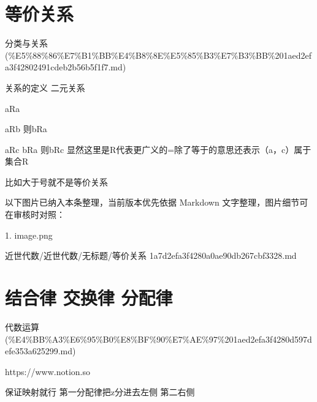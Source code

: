 \section*{等价关系}

\begin{note}[来源上级主题]

分类与关系 (\%E5\%88\%86\%E7\%B1\%BB\%E4\%B8\%8E\%E5\%85\%B3\%E7\%B3\%BB\%201aed2efa3f42802491cdeb2b56b5f1f7.md)

\end{note}

\begin{note}[等价关系]

关系的定义 二元关系

aRa

aRb 则bRa

aRc bRa 则bRc  显然这里是R代表更广义的=除了等于的意思还表示（a，c）属于集合R

比如大于号就不是等价关系

\end{note}

\begin{note}[关联图片]
以下图片已纳入本条整理，当前版本优先依据 Markdown 文字整理，图片细节可在审核时对照：

1. image.png\\

\end{note}

\begin{note}[来源路径]

近世代数/近世代数/无标题/等价关系 1a7d2efa3f4280a0ae90db267cbf3328.md

\end{note}

\section*{结合律 交换律 分配律}

\begin{note}[来源上级主题]

代数运算 (\%E4\%BB\%A3\%E6\%95\%B0\%E8\%BF\%90\%E7\%AE\%97\%201aed2efa3f4280d597defe353a625299.md)

\end{note}

\begin{note}

https://www.notion.so

保证映射就行 第一分配律把z分进去左侧 第二右侧

\end{note}


